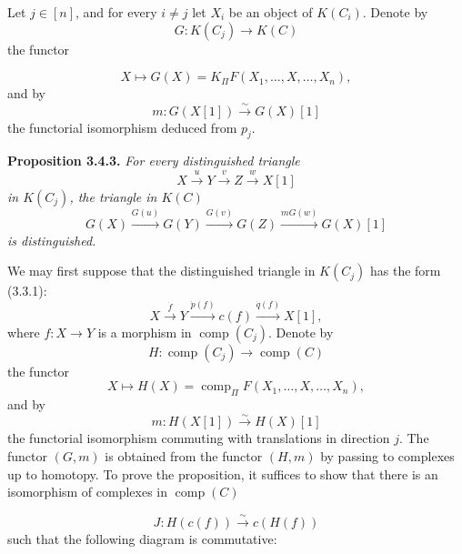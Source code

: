 \clearpage
{}%
\begingroup
\small
\setlength{\abovedisplayskip}{3pt plus 2pt minus 2pt}%
\setlength{\belowdisplayskip}{3pt plus 2pt minus 2pt}%
\setlength{\jot}{2pt}%

Let $j\in[n]$, and for every $i\neq j$ let $X_i$ be an object of $K(C_i)$.
Denote by
\[
  G\colon K(C_j)\longrightarrow K(C)
\]
the functor

\begingroup
\makeatletter
\tagsleft@true
\let\veqno\@@leqno
\makeatother
\begin{equation}
  X\longmapsto G(X)=K_{\Pi}F(X_1,\ldots,X,\ldots,X_n),
  \tag{3.4.2.1}
\end{equation}
\endgroup
{}
and by
\[
  m\colon G(X[1])\xrightarrow{\sim}G(X)[1]
\]
the functorial isomorphism deduced from $p_j$.

\noindent\textbf{Proposition 3.4.3.}\quad
\emph{For every distinguished triangle}
\[
  X\xrightarrow{u}Y\xrightarrow{v}Z\xrightarrow{w}X[1]
\]
\emph{in $K(C_j)$, the triangle in $K(C)$}
\[
  G(X)\xrightarrow{G(u)}G(Y)\xrightarrow{G(v)}G(Z)
  \xrightarrow{mG(w)}G(X)[1]
\]
\emph{is distinguished.}

We may first suppose that the distinguished triangle in $K(C_j)$ has the
form (3.3.1):
\[
  X\xrightarrow{\dot f}Y\xrightarrow{\dot p(f)}c(f)
  \xrightarrow{\dot q(f)}X[1],
\]
where $f\colon X\longrightarrow Y$ is a morphism in
$\operatorname{comp}(C_j)$. Denote by
\[
  H\colon\operatorname{comp}(C_j)\longrightarrow\operatorname{comp}(C)
\]
the functor
\[
  X\longmapsto H(X)=\operatorname{comp}_{\Pi}F
  (X_1,\ldots,X,\ldots,X_n),
\]
and by
\[
  m\colon H(X[1])\xrightarrow{\sim}H(X)[1]
\]
the functorial isomorphism commuting with translations in direction $j$.
The functor $(G,m)$ is obtained from the functor $(H,m)$ by passing to
complexes up to homotopy. To prove the proposition, it suffices to show that
there is an isomorphism of complexes in $\operatorname{comp}(C)$

\[
  J\colon H(c(f))\xrightarrow{\sim}c(H(f))
\]
such that the following diagram is commutative:

